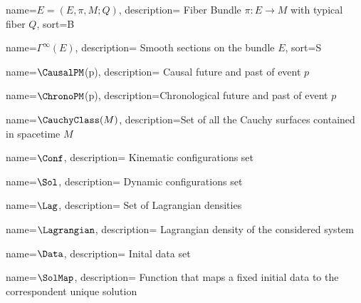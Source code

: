 \usepackage{glossaries}

\makenoidxglossaries


%
{%
	name={\ensuremath{E = (E,\pi , M;Q)}},
	description={ Fiber Bundle $\pi: E\rightarrow M$ with typical fiber $Q$},
    sort={B}
}

%
{%
	name={\ensuremath{\Gamma^\infty(E)}},
	description={ Smooth sections on the bundle $E$},
    sort={S}
}

	{%
		name={\ensuremath{\CausalPM}(p)},
		description={ Causal future and past of event $p$}
	}	

	{%
		name={\ensuremath{\ChronoPM}(p)},
		description={Chronological future and past of event $p$}
	}

	{%
		name={\ensuremath{\CauchyClass(M)}},
		description={Set of all the Cauchy surfaces contained in spacetime $M$}
	}

	{%
		name={\ensuremath{\Conf}},
		description={ Kinematic configurations set}
	}

	{%
		name={\ensuremath{\Sol}},
		description={ Dynamic configurations set}
	}

		
	{%
		name={\ensuremath{\Lag}},
		description={ Set of Lagrangian densities}
	}
		
	{%
		name={\ensuremath{\Lagrangian}},
		description={ Lagrangian density of the considered system}
	}
		
	{%
		name={\ensuremath{\Data}},
		description={ Inital data set}
	}
		
	{%
		name={\ensuremath{\SolMap}},
		description={ Function that maps a fixed initial data to the correspondent unique solution}
	}
		

